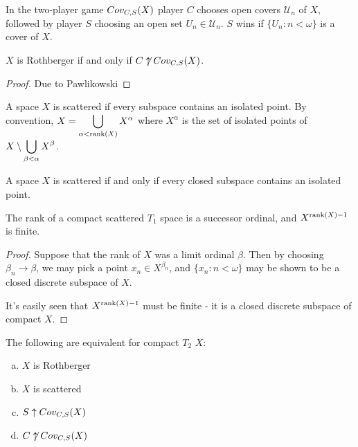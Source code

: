   \begin{definition}
    In the two-player game $Cov_{C,S}(X)$ player $C$ chooses open covers $\mathcal{U}_n$ of $X$, followed by player $S$ choosing an open set $U_n\in\mathcal{U}_n$. $S$ wins if $\{U_n:n<\omega\}$ is a cover of $X$.
  \end{definition}

  \begin{theorem}
    $X$ is Rothberger if and only if $C\not\uparrow Cov_{C,S}(X)$.
  \end{theorem}

  \begin{proof}
    Due to Pawlikowski
  \end{proof}

  \begin{definition}
    A space $X$ is scattered if every subspace contains an isolated point. By convention, $\displaystyle X = \bigcup_{\alpha<\textrm{rank}(X)}X^\alpha$ where $X^\alpha$ is the set of isolated points of $\displaystyle X\setminus\bigcup_{\beta<\alpha}X^\beta$.
  \end{definition}

  \begin{proposition}
    A space $X$ is scattered if and only if every closed subspace contains an isolated point.
  \end{proposition}

  \begin{proposition}
    The rank of a compact scattered $T_1$ space is a successor ordinal, and $X^{\textrm{rank}(X)-1}$ is finite.
  \end{proposition}

  \begin{proof}
    Suppose that the rank of $X$ was a limit ordinal $\beta$. Then by choosing $\beta_n\to\beta$, we may pick a point $x_n\in X^{\beta_n}$, and $\{x_n: n<\omega\}$ may be shown to be a closed discrete subspace of $X$.

    It's easily seen that $X^{\textrm{rank}(X)-1}$ must be finite - it is a closed discrete subspace of compact $X$.
  \end{proof}

  \begin{theorem}
    The following are equivalent for compact $T_2$ $X$:
      \begin{enumerate}[(a)]
        \item $X$ is Rothberger
        \item $X$ is scattered
        \item $S\uparrow Cov_{C,S}(X)$
        \item $C\not\uparrow Cov_{C,S}(X)$
      \end{enumerate}
  \end{theorem}

